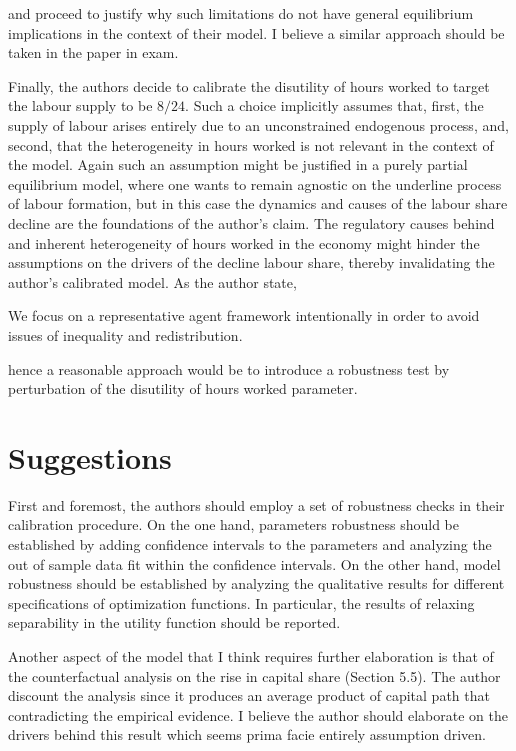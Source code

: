 \documentclass[american]{scrartcl}
\begin{document}
and proceed to justify why such limitations do not have general equilibrium implications in the context of their model. I believe a similar approach should be taken in the paper in exam.

Finally, the authors decide to calibrate the disutility of hours worked to target the labour supply to be $8/24$. Such a choice implicitly assumes that, first, the supply of labour arises entirely due to an unconstrained endogenous process, and, second, that the heterogeneity in hours worked is not relevant in the context of the model. Again such an assumption might be justified in a purely partial equilibrium model, where one wants to remain agnostic on the underline process of labour formation, but in this case the dynamics and causes of the labour share decline are the foundations of the author's claim. The regulatory causes behind and inherent heterogeneity of hours worked in the economy might hinder the assumptions on the drivers of the decline labour share, thereby invalidating the author's calibrated model. As the author state,

\begin{displayquote}[p. 3][]
    We focus on a representative agent framework intentionally in order to avoid issues of inequality and redistribution.
\end{displayquote}

hence a reasonable approach would be to introduce a robustness test by perturbation of the disutility of hours worked parameter.

\section{Suggestions}

First and foremost, the authors should employ a set of robustness checks in their calibration procedure. On the one hand, parameters robustness should be established by adding confidence intervals to the parameters and analyzing the out of sample data fit within the confidence intervals. On the other hand, model robustness should be established by analyzing the qualitative results for different specifications of optimization functions. In particular, the results of relaxing separability in the utility function should be reported.

Another aspect of the model that I think requires further elaboration is that of the counterfactual analysis on the rise in capital share (Section 5.5). The author discount the analysis since it produces an average product of capital path that contradicting the empirical evidence. I believe the author should elaborate on the drivers behind this result which seems prima facie entirely assumption driven.
\end{document}
